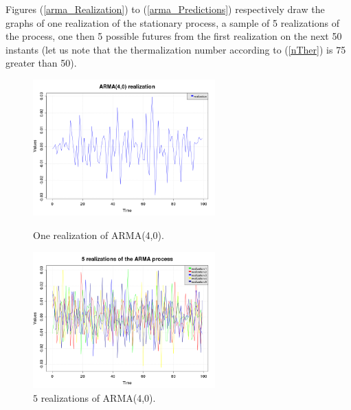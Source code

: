 Figures (\ref{arma_Realization}) to (\ref{arma_Predictions}) respectively draw the graphs of one realization of the stationary process, a sample of 5 realizations of the process, one then 5  possible futures from the first realization on the next 50 instants (let us note that the thermalization number according to (\ref{nTher}) is 75 greater than 50).


\begin{figure}[H]
  \begin{minipage}{9cm}
    \begin{center}
      \includegraphics[width=7cm]{arma1D_realization.png}
      \caption{One realization of ARMA(4,0).}
      \label{arma_Realization}
    \end{center}
  \end{minipage}
  \hfill
  \begin{minipage}{9cm}
    \begin{center}
      \includegraphics[width=7cm]{arma1D_realizations.png}
      \caption{$5$ realizations of ARMA(4,0).}
      \label{arma_Realizations}
    \end{center}
  \end{minipage}
\end{figure}


